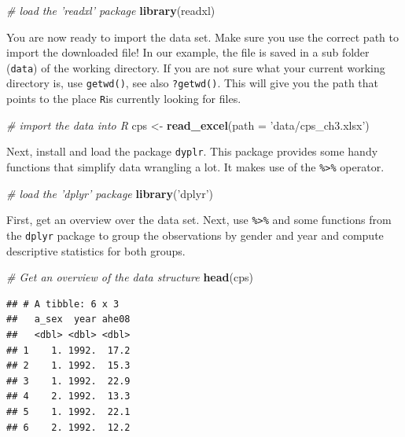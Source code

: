 \documentclass[]{book}
\newenvironment{Shaded}{\begin{snugshade}}{\end{snugshade}}
\newcommand{\KeywordTok}[1]{\textcolor[rgb]{0.13,0.29,0.53}{\textbf{#1}}}
\newcommand{\DataTypeTok}[1]{\textcolor[rgb]{0.13,0.29,0.53}{#1}}
\newcommand{\StringTok}[1]{\textcolor[rgb]{0.31,0.60,0.02}{#1}}
\newcommand{\CommentTok}[1]{\textcolor[rgb]{0.56,0.35,0.01}{\textit{#1}}}
\newcommand{\NormalTok}[1]{#1}
\theoremstyle{definition}
\theoremstyle{definition}
\theoremstyle{definition}
\theoremstyle{remark}
\begin{document}
\begin{Shaded}
\begin{Highlighting}[]
\CommentTok{# load the 'readxl' package}
\KeywordTok{library}\NormalTok{(readxl)}
\end{Highlighting}
\end{Shaded}

You are now ready to import the data set. Make sure you use the correct
path to import the downloaded file! In our example, the file is saved in
a sub folder (\texttt{data}) of the working directory. If you are not
sure what your current working directory is, use \texttt{getwd()}, see
also \texttt{?getwd()}. This will give you the path that points to the
place \texttt{R}is currently looking for files.

\begin{Shaded}
\begin{Highlighting}[]
\CommentTok{# import the data into R}
\NormalTok{cps <-}\StringTok{ }\KeywordTok{read_excel}\NormalTok{(}\DataTypeTok{path =} \StringTok{'data/cps_ch3.xlsx'}\NormalTok{)}
\end{Highlighting}
\end{Shaded}

Next, install and load the package \texttt{dyplr}. This package provides
some handy functions that simplify data wrangling a lot. It makes use of
the \texttt{\%>\%} operator.

\begin{Shaded}
\begin{Highlighting}[]
\CommentTok{# load the 'dplyr' package}
\KeywordTok{library}\NormalTok{(}\StringTok{'dplyr'}\NormalTok{)}
\end{Highlighting}
\end{Shaded}

First, get an overview over the data set. Next, use \texttt{\%>\%} and
some functions from the \texttt{dplyr} package to group the observations
by gender and year and compute descriptive statistics for both groups.

\begin{Shaded}
\begin{Highlighting}[]
\CommentTok{# Get an overview of the data structure}
\KeywordTok{head}\NormalTok{(cps)}
\end{Highlighting}
\end{Shaded}

\begin{verbatim}
## # A tibble: 6 x 3
##   a_sex  year ahe08
##   <dbl> <dbl> <dbl>
## 1    1. 1992.  17.2
## 2    1. 1992.  15.3
## 3    1. 1992.  22.9
## 4    2. 1992.  13.3
## 5    1. 1992.  22.1
## 6    2. 1992.  12.2
\end{verbatim}
\end{document}
